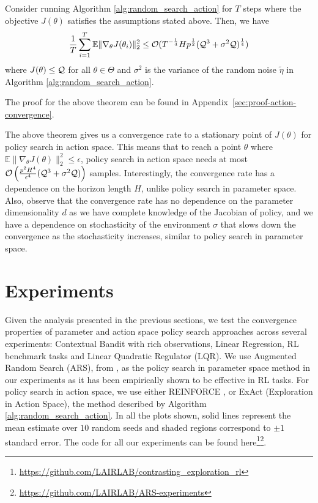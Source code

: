 \begin{theorem}
\label{theorem:action-convergence}
  Consider running Algorithm \ref{alg:random_search_action} for $T$
  steps where the objective $J(\theta)$ satisfies the assumptions stated above. Then, we have %
  \begin{equation}
    \label{eq:action-convergence}
    \frac{1}{T}\sum_{i=1}^T \mathbb{E}\|\nabla_\theta
    J(\theta_i)\|_2^2 \leq \mathcal{O}(T^{-\frac{1}{4}}Hp^{\frac{1}{2}}(\mathcal{Q}^3 + \sigma^2\mathcal{Q})^{\frac{1}{4}})
  \end{equation}
  where $J(\theta)\leq \mathcal{Q}$ for all $\theta \in \Theta$ and $\sigma^2$ is the variance of the random noise $\tilde{\eta}$ in Algorithm \ref{alg:random_search_action}.
\end{theorem}
The proof for the above theorem can be found in Appendix~\ref{sec:proof-action-convergence}.

The above theorem gives us a convergence rate to a stationary point of
$J(\theta)$ for policy search in action space. This means that to
reach a point $\theta$ where $\mathbb{E}\|\nabla_\theta
J(\theta)\|_2^2 \leq \epsilon$, policy search in action space needs at
most $\mathcal{O}\left( \frac{p^2H^4}{\epsilon^4} (\mathcal{Q}^3 + \sigma^2\mathcal{Q}) \right)$
samples. Interestingly, the convergence rate has a
dependence on the horizon length $H$, unlike policy search in
parameter space.
%
%
%
%
Also, observe that the 
convergence rate has no dependence on the parameter dimensionality $d$ as we have complete
knowledge of the Jacobian of policy, and  we have a dependence
on stochasticity of the environment $\sigma$ that slows down the convergence as the stochasticity 
increases, similar to policy search in parameter space.

\section{Experiments}
\label{sec:experiments}
Given the analysis presented in the previous sections, we test the
convergence properties of parameter and action space policy search
approaches across several experiments: Contextual Bandit with rich observations, Linear Regression, RL
benchmark tasks and Linear Quadratic Regulator (LQR). We use Augmented Random Search (ARS), from 
\citep{mania2018simple}, as the policy search in parameter space
method in our experiments as it has been empirically shown to be
effective in RL tasks. For policy search in action space, we use
either REINFORCE 
\citep{williams1992simple}, or ExAct (Exploration in Action Space), the method described by
Algorithm \ref{alg:random_search_action}.
In all the plots shown, solid lines
represent the mean estimate over $10$ random seeds and shaded regions
correspond to $\pm 1$ standard error.
The code for all our experiments can be found here\footnote{\url{https://github.com/LAIRLAB/contrasting_exploration_rl}}\footnote{\url{https://github.com/LAIRLAB/ARS-experiments}}.

